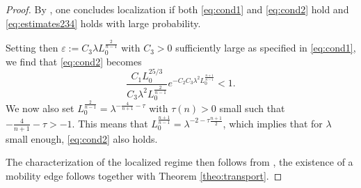 \documentclass[reqno,12pt,letterpaper]{amsart}
\numberwithin{equation}{section}
\begin{document}
{\begin{proof}
By \cite[Theorem $2.4$]{GK02}, one concludes localization if both \eqref{eq:cond1} and \eqref{eq:cond2} hold and \eqref{eq:estimates234} holds with large probability.
 
 Setting then $\varepsilon := C_3 \lambda L_0^{\frac{2}{n-1}}$ with $C_3>0$ sufficiently large as specified in \eqref{eq:cond1}, we find that \eqref{eq:cond2} becomes
\[ \frac{C_1 L_0^{25/3}}{C_3 \lambda^2 L_0^{\frac{2}{n-1}}}e^{-C_2 C_3 \lambda^2 L_0^{\frac{n+1}{n-1}}}<1.\]
We now also set $L_0^{\frac{2}{n-1}} = \lambda^{-\frac{4}{n+1} -\tau}$ with $\tau(n)>0$ small such that $-\frac{4}{n+1} -\tau>-1.$ This means that $L_0^{\frac{n+1}{n-1}}  = \lambda^{-2 -\tau \frac{n+1}{2}}$, which implies that for $\lambda$ small enough, \eqref{eq:cond2} also holds. 

The characterization of the localized regime then follows from \cite[Theorem $2.4$]{GK02}, the existence of a mobility edge follows together with Theorem \ref{theo:transport}.
\end{proof}}
\end{document}
